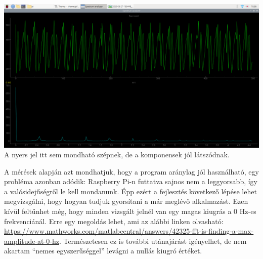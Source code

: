 \documentclass[12pt,a4paper]{article}
\begin{document}
      \includegraphics[width=\textwidth]{s_a_sawtooth.png}
      A nyers jel itt sem mondható szépnek, de a komponensek jól látszódnak.

      A mérések alapján azt mondhatjuk, hogy a program aránylag jól használható, egy probléma azonban adódik: Raspberry Pi-n futtatva sajnos nem a leggyorsabb, így a valósidejűségről le kell mondanunk. Épp ezért a fejlesztés következő lépése lehet megvizsgálni, hogy hogyan tudjuk gyorsítani a már meglévő alkalmazást. Ezen kívül feltűnhet még, hogy minden vizsgált jelnél van egy magas kiugrás a 0 Hz-es frekvenciánál. Erre egy megoldás lehet, ami az alábbi linken olvasható: \url{https://www.mathworks.com/matlabcentral/answers/42325-fft-is-finding-a-max-amplitude-at-0-hz}. Természetesen ez is további utánajárást igényelhet, de nem akartam ``nemes egyszerűséggel'' levágni a nullás kiugró értéket.
\end{document}
